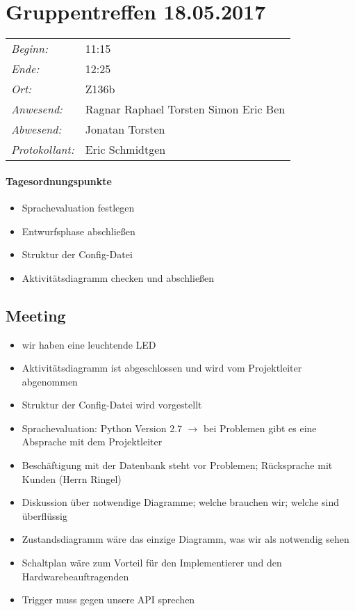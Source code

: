 \documentclass{scrartcl}
\date{18.05.2017}	%
\begin{document}
\maketitle
\section{Gruppentreffen 18.05.2017}	%
\begin{tabular}[t]{p{.25\linewidth} p{.25\linewidth}}
\emph{Beginn:}				& 11:15\\
\emph{Ende:}					& 12:25\\
\emph{Ort:}						& Z136b\\
\emph{Anwesend:}	& 
Ragnar\newline
Raphael\newline
Torsten\newline
Simon\newline
Eric\newline
Ben
\\
\emph{Abwesend:}		 & 
Jonatan \newline
Torsten 
\\
\emph{Protokollant:}& Eric Schmidtgen
\end{tabular}
\paragraph{Tagesordnungspunkte}
\begin{itemize}
\item Sprachevaluation festlegen
\item Entwurfsphase abschließen
\item Struktur der Config-Datei
\item Aktivitätsdiagramm checken und abschließen 
\end{itemize}

\subsection{Meeting}
\begin{itemize}
	\item wir haben eine leuchtende LED
	\item Aktivitätsdiagramm ist abgeschlossen und wird vom Projektleiter abgenommen
	\item Struktur der Config-Datei wird vorgestellt
	\item Sprachevaluation: Python Version 2.7 $\rightarrow$ bei Problemen gibt es eine Absprache mit dem Projektleiter
	\item Beschäftigung mit der Datenbank steht vor Problemen; Rücksprache mit Kunden (Herrn Ringel)
	\item Diskussion über notwendige Diagramme; welche brauchen wir; welche sind überflüssig
	\item Zustandsdiagramm wäre das einzige Diagramm, was wir als notwendig sehen
	\item Schaltplan wäre zum Vorteil für den Implementierer und den Hardwarebeauftragenden
	\item Trigger muss gegen unsere API sprechen
\end{itemize}
\end{document}
